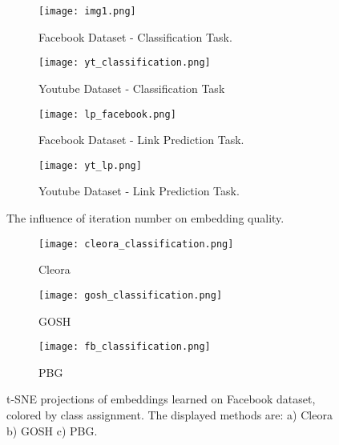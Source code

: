 \documentclass{IEEEtran}
\begin{document}
\begin{figure*}
     \centering
     \begin{subfigure}[b]{0.45\textwidth}
         \centering
         \texttt{[image: img1.png]}
         \caption{Facebook Dataset - Classification Task.}
         \label{fig:y equals x}
     \end{subfigure}
\hfill
     \begin{subfigure}[b]{0.45\textwidth}
         \centering
         \texttt{[image: yt\_classification.png]}
         \caption{Youtube Dataset - Classification Task}
         \label{fig:three sin x}
     \end{subfigure}
     \hfill
     \begin{subfigure}[b]{0.45\textwidth}
         \centering
         \texttt{[image: lp\_facebook.png]}
         \caption{Facebook Dataset - Link Prediction Task.}
         \label{fig:five over x}
     \end{subfigure}
     \hfill
     \begin{subfigure}[b]{0.45\textwidth}
         \centering
         \texttt{[image: yt\_lp.png]}
         \caption{Youtube Dataset - Link Prediction Task.}
         \label{fig:five over x}
     \end{subfigure}
        \caption{The influence of iteration number on embedding quality.}
        \label{fig:iternum}
\end{figure*}

\begin{figure*}
     \centering
     \begin{subfigure}[b]{0.3\textwidth}
         \centering
         \texttt{[image: cleora\_classification.png]}
         \caption{Cleora}
     \end{subfigure}
\hfill
     \begin{subfigure}[b]{0.3\textwidth}
         \centering
         \texttt{[image: gosh\_classification.png]}
         \caption{GOSH}
     \end{subfigure}
     \hfill
     \begin{subfigure}[b]{0.3\textwidth}
         \centering
         \texttt{[image: fb\_classification.png]}
         \caption{PBG}
     \end{subfigure}

        \caption{t-SNE projections of embeddings learned on Facebook dataset, colored by class assignment. The displayed methods are: a) Cleora b) GOSH c) PBG.}
        \label{fig:t-sne}
\end{figure*}
 
\end{document}
